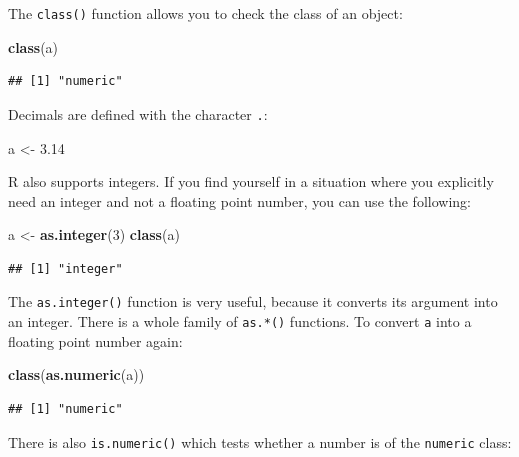 \documentclass[]{gitbook}
\newenvironment{Shaded}{\begin{snugshade}}{\end{snugshade}}
\newcommand{\DecValTok}[1]{\textcolor[rgb]{0.00,0.00,0.81}{#1}}
\newcommand{\FloatTok}[1]{\textcolor[rgb]{0.00,0.00,0.81}{#1}}
\newcommand{\KeywordTok}[1]{\textcolor[rgb]{0.13,0.29,0.53}{\textbf{#1}}}
\newcommand{\NormalTok}[1]{#1}
\newcommand{\StringTok}[1]{\textcolor[rgb]{0.31,0.60,0.02}{#1}}
\begin{document}
The \texttt{class()} function allows you to check the class of an object:

\begin{Shaded}
\begin{Highlighting}[]
\KeywordTok{class}\NormalTok{(a)}
\end{Highlighting}
\end{Shaded}

\begin{verbatim}
## [1] "numeric"
\end{verbatim}

Decimals are defined with the character \texttt{.}:

\begin{Shaded}
\begin{Highlighting}[]
\NormalTok{a <-}\StringTok{ }\FloatTok{3.14}
\end{Highlighting}
\end{Shaded}

R also supports integers. If you find yourself in a situation where you explicitly need an integer
and not a floating point number, you can use the following:

\begin{Shaded}
\begin{Highlighting}[]
\NormalTok{a  <-}\StringTok{ }\KeywordTok{as.integer}\NormalTok{(}\DecValTok{3}\NormalTok{)}
\KeywordTok{class}\NormalTok{(a)}
\end{Highlighting}
\end{Shaded}

\begin{verbatim}
## [1] "integer"
\end{verbatim}

The \texttt{as.integer()} function is very useful, because it converts its argument into an integer. There
is a whole family of \texttt{as.*()} functions. To convert \texttt{a} into a floating point number again:

\begin{Shaded}
\begin{Highlighting}[]
\KeywordTok{class}\NormalTok{(}\KeywordTok{as.numeric}\NormalTok{(a))}
\end{Highlighting}
\end{Shaded}

\begin{verbatim}
## [1] "numeric"
\end{verbatim}

There is also \texttt{is.numeric()} which tests whether a number is of the \texttt{numeric} class:
\end{document}
